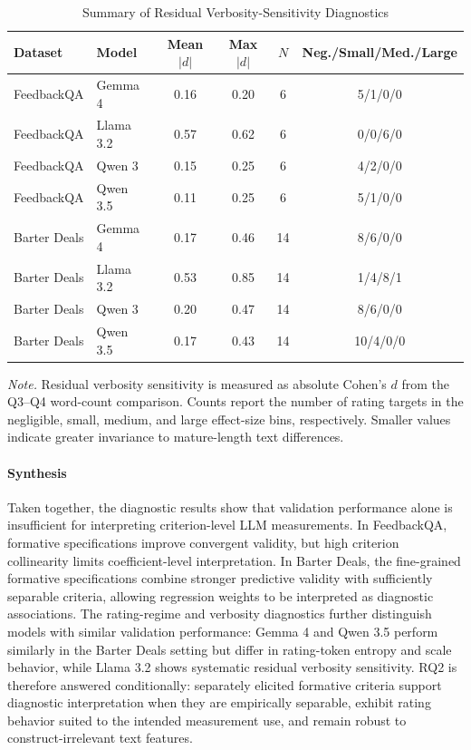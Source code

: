 \begin{table}[!t]
    \centering
    \small
    \caption{Summary of Residual Verbosity-Sensitivity Diagnostics}
    \label{tab:verbosity_bias}
    \setlength{\tabcolsep}{5pt}
    \begin{tabular}{llcccc}
    \toprule
    Dataset & Model & Mean $|d|$ & Max $|d|$ & $N$ & Neg./Small/Med./Large \\
    \midrule
    FeedbackQA & Gemma 4   & 0.16 & 0.20 & 6  & 5/1/0/0 \\
    FeedbackQA & Llama 3.2 & 0.57 & 0.62 & 6  & 0/0/6/0 \\
    FeedbackQA & Qwen 3    & 0.15 & 0.25 & 6  & 4/2/0/0 \\
    FeedbackQA & Qwen 3.5  & 0.11 & 0.25 & 6  & 5/1/0/0 \\

    \addlinespace[0.35em]
    Barter Deals & Gemma 4   & 0.17 & 0.46 & 14 & 8/6/0/0 \\
    Barter Deals & Llama 3.2 & 0.53 & 0.85 & 14 & 1/4/8/1 \\
    Barter Deals & Qwen 3    & 0.20 & 0.47 & 14 & 8/6/0/0 \\
    Barter Deals & Qwen 3.5  & 0.17 & 0.43 & 14 & 10/4/0/0 \\
    \bottomrule
    \end{tabular}

    \begin{flushleft}
    \footnotesize
    \textit{Note.} Residual verbosity sensitivity is measured as absolute Cohen's $d$ from the Q3--Q4 word-count comparison. Counts report the number of rating targets in the negligible, small, medium, and large effect-size bins, respectively. Smaller values indicate greater invariance to mature-length text differences.
    \end{flushleft}
\end{table}


\paragraph{Synthesis}

Taken together, the diagnostic results show that validation performance alone is insufficient for interpreting criterion-level LLM measurements. In FeedbackQA, formative specifications improve convergent validity, but high criterion collinearity limits coefficient-level interpretation. In Barter Deals, the fine-grained formative specifications combine stronger predictive validity with sufficiently separable criteria, allowing regression weights to be interpreted as diagnostic associations. The rating-regime and verbosity diagnostics further distinguish models with similar validation performance: Gemma 4 and Qwen 3.5 perform similarly in the Barter Deals setting but differ in rating-token entropy and scale behavior, while Llama 3.2 shows systematic residual verbosity sensitivity. RQ2 is therefore answered conditionally: separately elicited formative criteria support diagnostic interpretation when they are empirically separable, exhibit rating behavior suited to the intended measurement use, and remain robust to construct-irrelevant text features.


